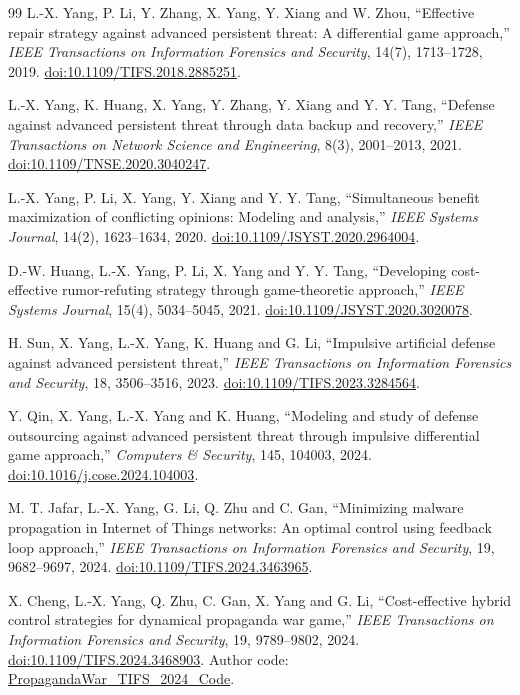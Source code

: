 \documentclass[11pt,a4paper]{article}
\theoremstyle{definition}
\theoremstyle{remark}
\begin{document}
\begin{thebibliography}{99}
 L.-X. Yang, P. Li, Y. Zhang, X. Yang, Y. Xiang and W. Zhou, ``Effective repair strategy against advanced persistent threat: A differential game approach,'' \emph{IEEE Transactions on Information Forensics and Security}, 14(7), 1713--1728, 2019. \href{https://doi.org/10.1109/TIFS.2018.2885251}{doi:10.1109/TIFS.2018.2885251}.

 L.-X. Yang, K. Huang, X. Yang, Y. Zhang, Y. Xiang and Y. Y. Tang, ``Defense against advanced persistent threat through data backup and recovery,'' \emph{IEEE Transactions on Network Science and Engineering}, 8(3), 2001--2013, 2021. \href{https://doi.org/10.1109/TNSE.2020.3040247}{doi:10.1109/TNSE.2020.3040247}.

 L.-X. Yang, P. Li, X. Yang, Y. Xiang and Y. Y. Tang, ``Simultaneous benefit maximization of conflicting opinions: Modeling and analysis,'' \emph{IEEE Systems Journal}, 14(2), 1623--1634, 2020. \href{https://doi.org/10.1109/JSYST.2020.2964004}{doi:10.1109/JSYST.2020.2964004}.

 D.-W. Huang, L.-X. Yang, P. Li, X. Yang and Y. Y. Tang, ``Developing cost-effective rumor-refuting strategy through game-theoretic approach,'' \emph{IEEE Systems Journal}, 15(4), 5034--5045, 2021. \href{https://doi.org/10.1109/JSYST.2020.3020078}{doi:10.1109/JSYST.2020.3020078}.

 H. Sun, X. Yang, L.-X. Yang, K. Huang and G. Li, ``Impulsive artificial defense against advanced persistent threat,'' \emph{IEEE Transactions on Information Forensics and Security}, 18, 3506--3516, 2023. \href{https://doi.org/10.1109/TIFS.2023.3284564}{doi:10.1109/TIFS.2023.3284564}.

 Y. Qin, X. Yang, L.-X. Yang and K. Huang, ``Modeling and study of defense outsourcing against advanced persistent threat through impulsive differential game approach,'' \emph{Computers \& Security}, 145, 104003, 2024. \href{https://doi.org/10.1016/j.cose.2024.104003}{doi:10.1016/j.cose.2024.104003}.

 M. T. Jafar, L.-X. Yang, G. Li, Q. Zhu and C. Gan, ``Minimizing malware propagation in Internet of Things networks: An optimal control using feedback loop approach,'' \emph{IEEE Transactions on Information Forensics and Security}, 19, 9682--9697, 2024. \href{https://doi.org/10.1109/TIFS.2024.3463965}{doi:10.1109/TIFS.2024.3463965}.

 X. Cheng, L.-X. Yang, Q. Zhu, C. Gan, X. Yang and G. Li, ``Cost-effective hybrid control strategies for dynamical propaganda war game,'' \emph{IEEE Transactions on Information Forensics and Security}, 19, 9789--9802, 2024. \href{https://doi.org/10.1109/TIFS.2024.3468903}{doi:10.1109/TIFS.2024.3468903}. Author code: \href{https://github.com/XiaojuanCheng/PropagandaWar_TIFS_2024_Code}{PropagandaWar\_TIFS\_2024\_Code}.


\end{thebibliography}
\end{document}
